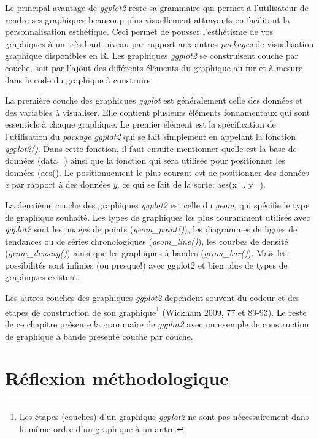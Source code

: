 \documentclass[
  letterpaper,
]{scrbook}
\begin{document}
Le principal avantage de \emph{ggplot2} reste sa grammaire qui permet à
l'utilisateur de rendre ses graphiques beaucoup plus visuellement
attrayants en facilitant la personnalisation esthétique. Ceci permet de
pousser l'esthétisme de vos graphiques à un très haut niveau par rapport
aux autres \emph{packages} de visualisation graphique disponibles en R.
Les graphiques \emph{ggplot2} se construisent couche par couche, soit
par l'ajout des différents éléments du graphique au fur et à mesure dans
le code du graphique à construire.

La première couche des graphiques \emph{ggplot} est généralement celle
des données et des variables à visualiser. Elle contient plusieurs
éléments fondamentaux qui sont essentiels à chaque graphique. Le premier
élément est la spécification de l'utilisation du \emph{package ggplot2}
qui se fait simplement en appelant la fonction \emph{ggplot2()}. Dans
cette fonction, il faut ensuite mentionner quelle est la base de données
(data=) ainsi que la fonction qui sera utilisée pour positionner les
données (aes(). Le positionnement le plus courant est de positionner des
données \emph{x} par rapport à des données \emph{y}, ce qui se fait de
la sorte: aes(x=, y=).

La deuxième couche des graphiques \emph{ggplot2} est celle du
\emph{geom}, qui spécifie le type de graphique souhaité. Les types de
graphiques les plus couramment utilisés avec \emph{ggplot2} sont les
nuages de points (\emph{geom\_point()}), les diagrammes de lignes de
tendances ou de séries chronologiques (\emph{geom\_line()}), les courbes
de densité (\emph{geom\_density()}) ainsi que les graphiques à bandes
(\emph{geom\_bar()}). Mais les possibilités sont infinies (ou presque!)
avec ggplot2 et bien plus de types de graphiques existent.

Les autres couches des graphiques \emph{ggplot2} dépendent souvent du
codeur et des étapes de construction de son graphique\footnote{Les
  étapes (couches) d'un graphique \emph{ggplot2} ne sont pas
  nécessairement dans le même ordre d'un graphique à un autre.} (Wickham
2009, 77 et 89-93). Le reste de ce chapitre présente la grammaire de
\emph{ggplot2} avec un exemple de construction de graphique à bande
présenté couche par couche.

\hypertarget{ruxe9flexion-muxe9thodologique}{%
\section{Réflexion
méthodologique}\label{ruxe9flexion-muxe9thodologique}}
\end{document}
